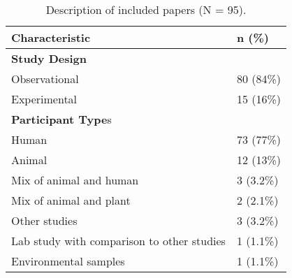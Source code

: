 \begin{table}[H]

\caption{Description of included papers (N = 95).} 
\begin{tabular}{ll}
  \toprule
{\bf Characteristic} & {\bf n (\%) } \\ 
  \midrule
\textbf {Study Design} &  \\ 
  Observational & 80 (84\%) \\ 
  Experimental & 15 (16\%) \\ 
  \textbf {Participant Type}s &  \\ 
  Human & 73 (77\%) \\ 
  Animal & 12 (13\%) \\ 
  Mix of animal and human & 3 (3.2\%) \\ 
  Mix of animal and plant & 2 (2.1\%) \\ 
  Other studies & 3 (3.2\%) \\ 
  Lab study with comparison to other studies & 1 (1.1\%) \\ 
  Environmental samples & 1 (1.1\%) \\ 
   \bottomrule
\end{tabular}
\end{table}

